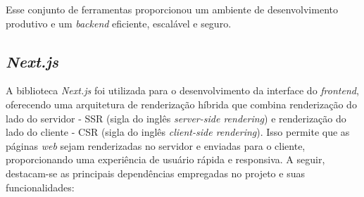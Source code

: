 Esse conjunto de ferramentas proporcionou um ambiente de desenvolvimento produtivo e um \textit{backend} eficiente, escalável e seguro.


\subsection{\textit{Next.js}}
A biblioteca \textit{Next.js} foi utilizada para o desenvolvimento da interface do \textit{frontend}, oferecendo uma arquitetura de renderização híbrida que combina renderização do lado do servidor - SSR (sigla do inglês \textit{server-side rendering}) e renderização do lado do cliente - CSR (sigla do inglês \textit{client-side rendering}). Isso permite que as páginas \textit{web} sejam renderizadas no servidor e enviadas para o cliente, proporcionando uma experiência de usuário rápida e responsiva. A seguir, destacam-se as principais dependências empregadas no projeto e suas funcionalidades:

